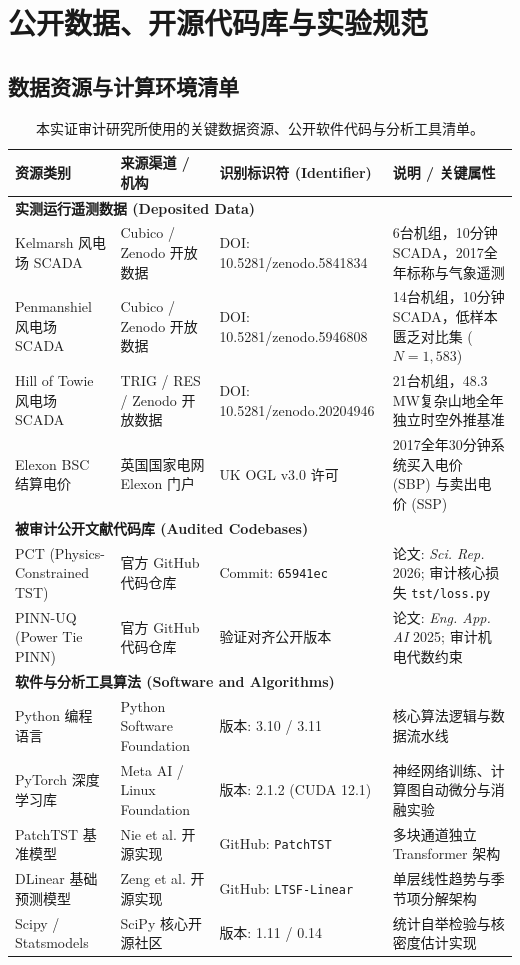 \section{公开数据、开源代码库与实验规范}
\label{sec:data_code_spec}

\subsection{数据资源与计算环境清单}
\begin{table}[!ht]
\centering
\footnotesize
\caption{本实证审计研究所使用的关键数据资源、公开软件代码与分析工具清单。}
\label{tab:key_resources}
\begin{tabularx}{\textwidth}{p{3.5cm}p{4.2cm}p{3.5cm}X}
\toprule
\textbf{资源类别} & \textbf{来源渠道 / 机构} & \textbf{识别标识符 (Identifier)} & \textbf{说明 / 关键属性} \\
\midrule
\multicolumn{4}{l}{\textbf{实测运行遥测数据 (Deposited Data)}} \\
Kelmarsh 风电场 SCADA & Cubico / Zenodo 开放数据 & DOI: 10.5281/zenodo.5841834 & 6台机组，10分钟SCADA，2017全年标称与气象遥测 \\
Penmanshiel 风电场 SCADA & Cubico / Zenodo 开放数据 & DOI: 10.5281/zenodo.5946808 & 14台机组，10分钟SCADA，低样本匮乏对比集 ($N=1,583$) \\
Hill of Towie 风电场 SCADA & TRIG / RES / Zenodo 开放数据 & DOI: 10.5281/zenodo.20204946 & 21台机组，48.3 MW复杂山地全年独立时空外推基准 \\
Elexon BSC 结算电价 & 英国国家电网 Elexon 门户 & UK OGL v3.0 许可 & 2017全年30分钟系统买入电价 (SBP) 与卖出电价 (SSP) \\
\midrule
\multicolumn{4}{l}{\textbf{被审计公开文献代码库 (Audited Codebases)}} \\
PCT (Physics-Constrained TST) & 官方 GitHub 代码仓库 & Commit: \texttt{65941ec} & 论文: \textit{Sci. Rep.} 2026; 审计核心损失 \texttt{tst/loss.py} \\
PINN-UQ (Power Tie PINN) & 官方 GitHub 代码仓库 & 验证对齐公开版本 & 论文: \textit{Eng. App. AI} 2025; 审计机电代数约束 \\
\midrule
\multicolumn{4}{l}{\textbf{软件与分析工具算法 (Software and Algorithms)}} \\
Python 编程语言 & Python Software Foundation & 版本: 3.10 / 3.11 & 核心算法逻辑与数据流水线 \\
PyTorch 深度学习库 & Meta AI / Linux Foundation & 版本: 2.1.2 (CUDA 12.1) & 神经网络训练、计算图自动微分与消融实验 \\
PatchTST 基准模型 & Nie et al. 开源实现 & GitHub: \texttt{PatchTST} & 多块通道独立 Transformer 架构 \\
DLinear 基础预测模型 & Zeng et al. 开源实现 & GitHub: \texttt{LTSF-Linear} & 单层线性趋势与季节项分解架构 \\
Scipy / Statsmodels & SciPy 核心开源社区 & 版本: 1.11 / 0.14 & 统计自举检验与核密度估计实现 \\
\bottomrule
\end{tabularx}
\end{table}

